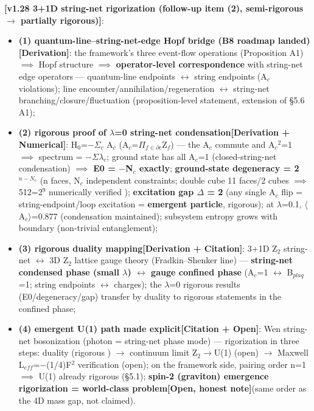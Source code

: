 \documentclass[12pt]{article}
\newcommand{\mtag}[1]{\textbf{[#1]}}
\newcommand{\up}[1]{\ensuremath{^{#1}}}
\newcommand{\down}[1]{\ensuremath{_{#1}}}
\begin{document}
\textbf{\mtag{v1.28 3+1D string-net rigorization (follow-up item (2), semi-rigorous \ensuremath{\to} partially rigorous)}}:
\begin{itemize}
\item \textbf{(1) quantum-line--string-net-edge Hopf bridge (B8 roadmap landed)}\mtag{Derivation}: the framework's three event-flow operations (Proposition A1) \ensuremath{\implies} Hopf structure \ensuremath{\implies} \textbf{operator-level correspondence} with string-net edge operators --- quantum-line endpoints \ensuremath{\leftrightarrow} string endpoints (A\down{c} violations); line encounter/annihilation/regeneration \ensuremath{\leftrightarrow} string-net branching/closure/fluctuation (proposition-level statement, extension of \S{}5.6 A1);
\item \textbf{(2) rigorous proof of \ensuremath{\lambda}=0 string-net condensation}\mtag{Derivation + Numerical}: H\down{0}=\ensuremath{-}\ensuremath{\Sigma}\down{c} A\down{c} (A\down{c}=\ensuremath{\Pi}\down{f\in{}\partial{}c}Z\down{f}) --- the A\down{c} commute and A\down{c}\up{2}=1 \ensuremath{\implies} spectrum = \ensuremath{-}\ensuremath{\Sigma}\ensuremath{\lambda}\down{c}; ground state has all A\down{c}=1 (closed-string-net condensation) \ensuremath{\implies} \textbf{E0 = \ensuremath{-}N\down{c} exactly}; \textbf{ground-state degeneracy = 2\up{n-N\down{c}}} (n faces, N\down{c} independent constraints; double cube 11 faces/2 cubes \ensuremath{\implies} 512=2\up{9} numerically verified \checkmark); \textbf{excitation gap \ensuremath{\Delta} = 2} (any single A\down{c} flip = string-endpoint/loop excitation = \textbf{emergent particle}, rigorous); at \ensuremath{\lambda}=0.1, \ensuremath{\langle}A\down{c}\ensuremath{\rangle}=0.877 (condensation maintained); subsystem entropy grows with boundary (non-trivial entanglement);
\item \textbf{(3) rigorous duality mapping}\mtag{Derivation + Citation}: 3+1D Z\down{2} string-net \ensuremath{\leftrightarrow} 3D Z\down{2} lattice gauge theory (Fradkin--Shenker line) --- \textbf{string-net condensed phase (small \ensuremath{\lambda}) \ensuremath{\leftrightarrow} gauge confined phase} (A\down{c}=1 \ensuremath{\leftrightarrow} B\down{plaq}=1; string endpoints \ensuremath{\leftrightarrow} charges); the \ensuremath{\lambda}=0 rigorous results (E0/degeneracy/gap) transfer by duality to rigorous statements in the confined phase;
\item \textbf{(4) emergent U(1) path made explicit}\mtag{Citation + Open}: Wen string-net bosonization (photon = string-net phase mode) --- rigorization in three steps: duality (rigorous \checkmark) \ensuremath{\to} continuum limit Z\down{2}\ensuremath{\to}U(1) (open) \ensuremath{\to} Maxwell L\down{eff}=\ensuremath{-}(1/4)F\up{2} verification (open); on the framework side, pairing order n=1 \ensuremath{\implies} U(1) already rigorous (\S{}5.1); \textbf{spin-2 (graviton) emergence rigorization = world-class problem}\mtag{Open, honest note}(same order as the 4D mass gap, not claimed).

\end{itemize}
\end{document}
